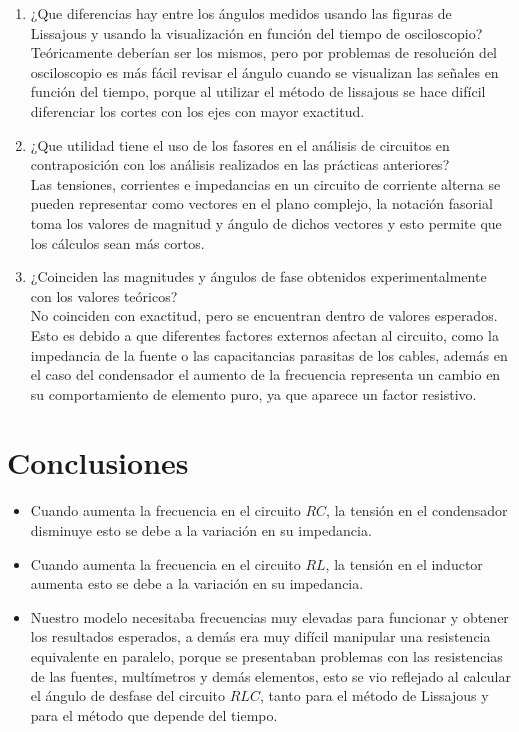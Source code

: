 \documentclass[twocolumn]{IEEEtran}
\begin{document}
\begin{enumerate}
 \item ¿Que diferencias hay entre los ángulos medidos usando las figuras de Lissajous y usando la visualización en función del tiempo de osciloscopio?\\
Teóricamente deberían ser los mismos, pero por problemas de resolución del osciloscopio es más fácil revisar el ángulo cuando se visualizan las señales en función del tiempo, porque al utilizar el método de lissajous se hace difícil diferenciar los cortes con los ejes con mayor exactitud.
 \item ¿Que utilidad tiene el uso de los fasores en el análisis de circuitos en contraposición con los análisis realizados en las prácticas anteriores?\\
Las tensiones, corrientes e impedancias en un circuito de corriente alterna se pueden representar como vectores en el plano complejo, la notación fasorial toma los valores de magnitud y ángulo de dichos vectores y esto permite que los cálculos sean más cortos.
 \item ¿Coinciden las magnitudes y ángulos de fase obtenidos experimentalmente con los valores teóricos?\\
No coinciden con exactitud, pero se encuentran dentro de valores esperados. Esto es debido a que diferentes factores externos afectan al circuito, como la impedancia de la fuente o las capacitancias parasitas de los cables, además en el caso del condensador el aumento de la frecuencia representa un cambio en su comportamiento de elemento puro, ya que aparece un factor resistivo.
\end{enumerate}

\section{Conclusiones}
\begin{itemize}
 \item Cuando aumenta la frecuencia en el circuito $RC$, la tensión en el condensador disminuye esto se debe a la variación en su impedancia.
 \item Cuando aumenta la frecuencia en el circuito $RL$, la tensión en el inductor aumenta esto se debe a la variación en su impedancia.
 \item Nuestro modelo necesitaba frecuencias muy elevadas para funcionar y obtener los resultados esperados, a demás era muy difícil manipular una resistencia equivalente en paralelo, porque se presentaban problemas con las resistencias de las fuentes, multímetros y demás elementos, esto se vio reflejado al calcular el ángulo de desfase del circuito $RLC$, tanto para el método de Lissajous y para el método que depende del tiempo.
\end{itemize}
\end{document}

